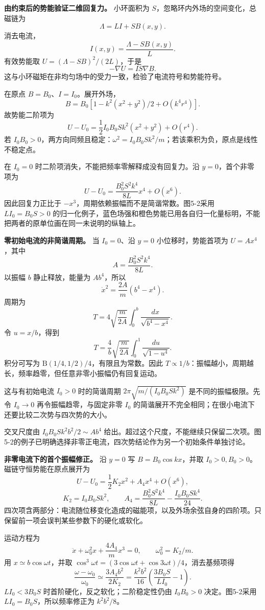 \documentclass[12pt,a4paper,UTF8]{ctexart}
\begin{document}
\textbf{由约束后的势能验证二维回复力。} 小环面积为
\(S\)，忽略环内外场的空间变化，总磁链为 \[
\Lambda=LI+SB(x,y).
\] 消去电流， \[
I(x,y)=\frac{\Lambda-SB(x,y)}L.
\] 有效势能取 \(U=(\Lambda-SB)^2/(2L)\)，于是 \[
-\nabla U=IS\nabla B.
\] 这与小环磁矩在非均匀场中的受力一致，检验了电流符号和势能符号。

在原点 \(B=B_0\)、\(I=I_0\)。展开外场， \[
B=B_0[1-k^2(x^2+y^2)/2+O(k^4r^4)].
\] 故势能二阶项为 \[
U-U_0=\frac12I_0B_0Sk^2(x^2+y^2)+O(r^4).
\] 若
\(I_0B_0>0\)，两方向同频且稳定：\(\omega^2=I_0B_0Sk^2/m\)；若该乘积为负，原点是线性不稳定点。

在 \(I_0=0\) 时二阶项消失，不能把频率零解释成没有回复力。沿
\(y=0\)，首个非零项为 \[
U-U_0=\frac{B_0^2S^2k^4}{8L}x^4+O(x^6).
\] 因此回复力正比于 \(-x^3\)，周期依赖振幅而不是简谐常数。图5-2采用
\(LI_0=B_0S>0\)
的归一化例子，蓝色场强和橙色势能已用各自归一化量标明，不能把两者的原单位画在同一未说明的纵轴上。

\textbf{零初始电流的非简谐周期。} 当 \(I_0=0\)、沿 \(y=0\)
小位移时，势能首项为 \(U=Ax^4\)，其中 \[
A=\frac{B_0^2S^2k^4}{8L}.
\] 以振幅 \(b\) 静止释放，能量为 \(Ab^4\)，所以 \[
\dot x^2=\frac{2A}{m}(b^4-x^4).
\] 周期为 \[
T=4\sqrt{\frac m{2A}}\int_0^b\frac{dx}{\sqrt{b^4-x^4}}.
\] 令 \(u=x/b\)，得到 \[
T=\frac4b\sqrt{\frac m{2A}}\int_0^1\frac{du}{\sqrt{1-u^4}}.
\] 积分可写为 \(\mathrm B(1/4,1/2)/4\)，有限且为常数。因此
\(T\propto1/b\)：振幅越小，周期越长，频率趋零，但任意非零小振幅仍有回复运动。

这与有初始电流 \(I_0>0\) 时的简谐周期 \(2\pi\sqrt{m/(I_0B_0Sk^2)}\)
是不同的振幅极限。先令 \(I_0\to0\) 再令振幅趋零，与固定非零 \(I_0\)
的简谐展开不完全相同；在很小电流下还要比较二次势与四次势的大小。

交叉尺度由 \(I_0B_0Sk^2b^2/2\sim Ab^4\)
给出。超过这个尺度，不能继续只保留二次项。图5-2的例子已明确选择非零正电流，四次势结论作为另一个初始条件单独讨论。

\textbf{非零电流下的首个振幅修正。} 沿 \(y=0\) 写 \(B=B_0\cos kx\)，并取
\(I_0>0,B_0>0\)。磁链守恒势能在原点展开为 \[
U-U_0=\frac12K_2x^2+A_4x^4+O(x^6),
\] \[
K_2=I_0B_0Sk^2,
\qquad A_4=\frac{B_0^2S^2k^4}{8L}-\frac{I_0B_0Sk^4}{24}.
\]
四次项含两部分：电流随位移变化造成的磁能项，以及外场余弦自身的四阶项。只保留前一项会误判某些参数下的硬化或软化。

运动方程为 \[
\ddot x+\omega_0^2x+\frac{4A_4}{m}x^3=0,
\qquad\omega_0^2=K_2/m.
\] 用 \(x\simeq b\cos\omega t\)，并取
\(\cos^3\omega t=(3\cos\omega t+\cos3\omega t)/4\)，消去基频项得 \[
\frac{\omega-\omega_0}{\omega_0}
\simeq\frac{3A_4b^2}{2K_2}
=\frac{k^2b^2}{16}\left(\frac{3B_0S}{LI_0}-1\right).
\] \(LI_0<3B_0S\) 时首阶硬化，反之软化；二阶稳定性仍由 \(I_0B_0>0\)
决定。图5-2采用 \(LI_0=B_0S\)，所以频率修正为 \(k^2b^2/8\)。
\end{document}
